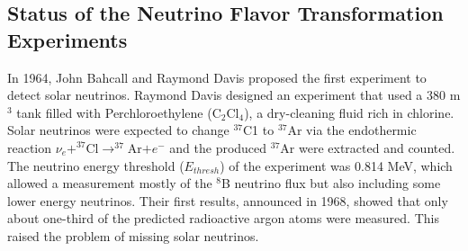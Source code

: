 \subsection{Status of the Neutrino Flavor Transformation Experiments}
In 1964, John Bahcall and Raymond Davis proposed the first experiment to detect solar neutrinos\cite{bahcall1964solar,davis1964solar}. Raymond Davis designed an experiment that used a 380 m$^3$ tank filled with Perchloroethylene (C$_2$Cl$_4$), a dry-cleaning fluid rich in chlorine. Solar neutrinos were expected to change $^{37}$C1 to $^{37}$Ar via the endothermic reaction $\nu_e+^{37}$Cl$\to^{37}$Ar$+e^-$ and the produced $^{37}$Ar were extracted and counted. The neutrino energy threshold ($E_{thresh}$) of the experiment was 0.814 MeV, which allowed a measurement mostly of the $^8$B neutrino flux but also including some lower energy neutrinos\cite{davis1964solar}. Their first results, announced in 1968, showed that only about one-third of the predicted radioactive argon atoms were measured. This raised the problem of missing solar neutrinos.

